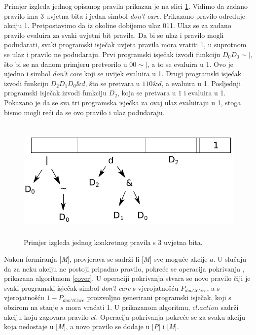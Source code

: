 \documentclass[times, utf8, zavrsni]{fer}
\begin{document}
Primjer izgleda jednog opisanog pravila prikazan je na slici \ref{img:clex}.
Vidimo da zadano pravilo ima 3 uvjetna bita i jedan simbol \emph{don't care}.
Prikazano pravilo određuje akciju 1.
Pretpostavimo da iz okoline dobijemo ulaz 011.
Ulaz se za zadano pravilo evaluira za svaki uvjetni bit pravila.
Da bi se ulaz i pravilo mogli podudarati, svaki programski isječak uvjeta pravila mora vratiti 1, u suprotnom se ulaz i pravilo ne podudaraju.
Prvi programski isječak izvodi funkciju $D_{0}D_{0}\sim|$, što bi se na danom primjeru pretvorilo u $00\sim|$, a to se evaluira u 1.
Ovo je ujedno i simbol \emph{don't care} koji se uvijek evaluira u 1.
Drugi programski isječak izvodi funkciju $D_{2}D_{1}D_{0}\&d$, što se pretvara u $110\&d$, a evaluira u 1.
Posljednji programski isječak izvodi funkciju $D_{2}$, koja se pretvara u $1$ i evaluira u 1.
Pokazano je da se sva tri programska isječka za ovaj ulaz evaluiraju u 1, stoga bismo mogli reći da se ovo pravilo i ulaz podudaraju.
\begin{figure}[h]
    \centering
    \includegraphics[height=6cm]{img/clex.pdf}
    \caption{Primjer izgleda jednog konkretnog pravila s 3 uvjetna bita.}
    \label{img:clex}
\end{figure}

Nakon formiranja [\emph{M}], provjerava se sadrži li [\emph{M}] sve moguće akcije $a$.
U slučaju da za neku akciju ne postoji pripadno pravilo, pokreće se operacija pokrivanja , prikazana algoritmom \ref{cover}.
U operaciji pokrivanja stvara se novo pravilo čiji je svaki programski isječak simbol \emph{don't care} s vjerojatnošću $P_{don'tCare}$, a s vjerojatnošću $1 - P_{don'tCare}$ proizvoljno generirani programski isječak, koji s obzirom na stanje $s$ mora vraćati 1.
U prikazanom algoritmu, $cl.action$ sadrži akciju koju zagovara pravilo $cl$.
Operacija pokrivanja pokreće se za svaku akciju koja nedostaje u [\emph{M}], a novo pravilo se dodaje u [\emph{P}] i [\emph{M}].
\end{document}
